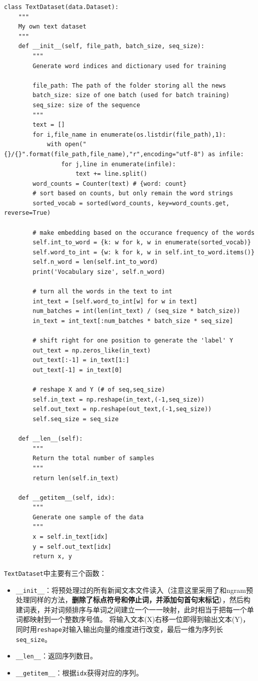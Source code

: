 \documentclass[logo,reportComp]{thesis}
\begin{document}
\begin{lstlisting}
class TextDataset(data.Dataset):
    """
    My own text dataset
    """
    def __init__(self, file_path, batch_size, seq_size):
        """
        Generate word indices and dictionary used for training

        file_path: The path of the folder storing all the news
        batch_size: size of one batch (used for batch training)
        seq_size: size of the sequence
        """
        text = []
        for i,file_name in enumerate(os.listdir(file_path),1):
            with open("{}/{}".format(file_path,file_name),"r",encoding="utf-8") as infile:
                for j,line in enumerate(infile):
                    text += line.split()
        word_counts = Counter(text) # {word: count}
        # sort based on counts, but only remain the word strings
        sorted_vocab = sorted(word_counts, key=word_counts.get, reverse=True)

        # make embedding based on the occurance frequency of the words
        self.int_to_word = {k: w for k, w in enumerate(sorted_vocab)}
        self.word_to_int = {w: k for k, w in self.int_to_word.items()}
        self.n_word = len(self.int_to_word)
        print('Vocabulary size', self.n_word)

        # turn all the words in the text to int
        int_text = [self.word_to_int[w] for w in text]
        num_batches = int(len(int_text) / (seq_size * batch_size))
        in_text = int_text[:num_batches * batch_size * seq_size]

        # shift right for one position to generate the 'label' Y
        out_text = np.zeros_like(in_text)
        out_text[:-1] = in_text[1:]
        out_text[-1] = in_text[0]

        # reshape X and Y (# of seq,seq_size)
        self.in_text = np.reshape(in_text,(-1,seq_size))
        self.out_text = np.reshape(out_text,(-1,seq_size))
        self.seq_size = seq_size

    def __len__(self):
        """
        Return the total number of samples
        """
        return len(self.in_text)

    def __getitem__(self, idx):
        """
        Generate one sample of the data
        """
        x = self.in_text[idx]
        y = self.out_text[idx]
        return x, y
\end{lstlisting}

\verb'TextDataset'中主要有三个函数：
\begin{itemize}
    \item \verb'__init__'：将预处理过的所有新闻文本文件读入（注意这里采用了和ngram预处理同样的方法，\textbf{删除了标点符号和停止词，并添加句首句末标记}），然后构建词表，并对词频排序与单词之间建立一个一一映射，此时相当于把每一个单词都映射到一个整数序号值。
    将输入文本(X)右移一位即得到输出文本(Y)，同时用\verb'reshape'对输入输出向量的维度进行改变，最后一维为序列长\verb'seq_size'。
    \item \verb'__len__'：返回序列数目。
    \item \verb'__getitem__'：根据\verb'idx'获得对应的序列。
\end{itemize}
\end{document}

